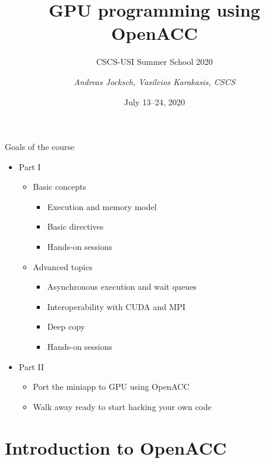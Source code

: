 \documentclass[12pt,aspectratio=169]{beamer}
\author{\emph{Andreas Jocksch, Vasileios Karakasis, CSCS}}
\title{GPU programming using OpenACC}
\subtitle{CSCS-USI Summer School 2020}
\date{July 13--24, 2020}
\begin{document}
\cscstitle

\begin{frame}{Goals of the course}
  \begin{itemize}
  \item Part I
    \begin{itemize}
    \item Basic concepts
      \begin{itemize}
      \item Execution and memory model
      \item Basic directives
      \item Hands-on sessions
      \end{itemize}
    \item Advanced topics
      \begin{itemize}
      \item Asynchronous execution and wait queues
      \item Interoperability with CUDA and MPI
      \item Deep copy
      \item Hands-on sessions
      \end{itemize}
    \end{itemize}
  \item  Part II
    \begin{itemize}
    \item Port the miniapp to GPU using OpenACC
    \item Walk away ready to start hacking your own code
    \end{itemize}
  \end{itemize}
\end{frame}

\part{Introduction to OpenACC}

\end{document}
